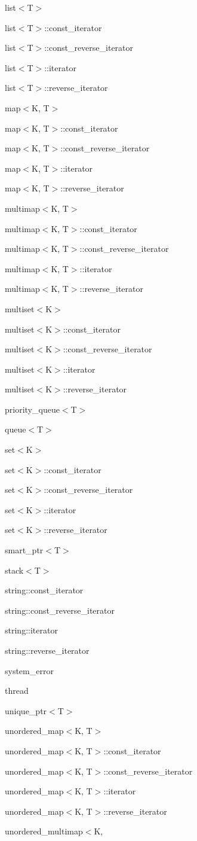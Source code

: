 \begin{DoxyCompactList}
\item list$<$T$>$\item list$<$T$>$\+:\+:const\+\_\+iterator\item list$<$T$>$\+:\+:const\+\_\+reverse\+\_\+iterator\item list$<$T$>$\+:\+:iterator\item list$<$T$>$\+:\+:reverse\+\_\+iterator\item map$<$K, T$>$\item map$<$K, T$>$\+:\+:const\+\_\+iterator\item map$<$K, T$>$\+:\+:const\+\_\+reverse\+\_\+iterator\item map$<$K, T$>$\+:\+:iterator\item map$<$K, T$>$\+:\+:reverse\+\_\+iterator\item multimap$<$K, T$>$\item multimap$<$K, T$>$\+:\+:const\+\_\+iterator\item multimap$<$K, T$>$\+:\+:const\+\_\+reverse\+\_\+iterator\item multimap$<$K, T$>$\+:\+:iterator\item multimap$<$K, T$>$\+:\+:reverse\+\_\+iterator\item multiset$<$K$>$\item multiset$<$K$>$\+:\+:const\+\_\+iterator\item multiset$<$K$>$\+:\+:const\+\_\+reverse\+\_\+iterator\item multiset$<$K$>$\+:\+:iterator\item multiset$<$K$>$\+:\+:reverse\+\_\+iterator\item priority\+\_\+queue$<$T$>$\item queue$<$T$>$\item set$<$K$>$\item set$<$K$>$\+:\+:const\+\_\+iterator\item set$<$K$>$\+:\+:const\+\_\+reverse\+\_\+iterator\item set$<$K$>$\+:\+:iterator\item set$<$K$>$\+:\+:reverse\+\_\+iterator\item smart\+\_\+ptr$<$T$>$\item stack$<$T$>$\item string\+:\+:const\+\_\+iterator\item string\+:\+:const\+\_\+reverse\+\_\+iterator\item string\+:\+:iterator\item string\+:\+:reverse\+\_\+iterator\item system\+\_\+error\item thread\item unique\+\_\+ptr$<$T$>$\item unordered\+\_\+map$<$K, T$>$\item unordered\+\_\+map$<$K, T$>$\+:\+:const\+\_\+iterator\item unordered\+\_\+map$<$K, T$>$\+:\+:const\+\_\+reverse\+\_\+iterator\item unordered\+\_\+map$<$K, T$>$\+:\+:iterator\item unordered\+\_\+map$<$K, T$>$\+:\+:reverse\+\_\+iterator\item unordered\+\_\+multimap$<$K, 
\end{DoxyCompactList}
